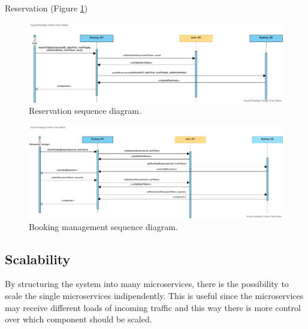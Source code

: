 Reservation (Figure \ref{fig:reserve})

\begin{figure}
    \includegraphics[width=\linewidth]{../docs/sequence/booking/reserve.png}
    \caption{Reservation sequence diagram.}
    \label{fig:reserve}
\end{figure}

\begin{figure}
    \includegraphics[width=\linewidth]{../docs/sequence/manageBooking/manageBooking.png}
    \caption{Booking management sequence diagram.}
    \label{fig:manage_booking}
\end{figure}

\subsection{Scalability}

By structuring the system into many microservices, there is the possibility
to scale the single microservices indipendently. This is useful since the
microservices may receive different loads of incoming traffic and this
way there is more control over which component should be scaled.
